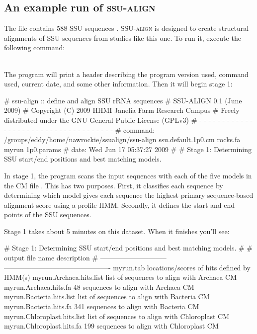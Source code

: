 \subsection{An example run of \textsc{ssu-align}}

The file  contains 588 SSU sequences
\cite{Walker07}. \textsc{SSU-align} is designed to create structural
alignments of SSU sequences from studies like this one. To run it,
execute the following command:

\\

The program will print a header describing the program version used,
command used, current date, and some other information. Then it will
begin stage 1:

\begin{sreoutput}
# ssu-align :: define and align SSU rRNA sequences
# SSU-ALIGN 0.1 (June 2009)
# Copyright (C) 2009 HHMI Janelia Farm Research Campus
# Freely distributed under the GNU General Public License (GPLv3)
# - - - - - - - - - - - - - - - - - - - - - - - - - - - - - - - - - - - -
# command: /groups/eddy/home/nawrockie/ssualign/ssu-align ssu.default.1p0.cm rocks.fa myrun 1p0.params
# date:    Wed Jun 17 05:37:27 2009
#
# Stage 1: Determining SSU start/end positions and best matching models.
\end{sreoutput}

In stage 1, the program scans the input sequences with each of the
five models in the CM file . This has two
purposes.  First, it classifies each sequence by determining which
model gives each sequence the highest primary sequence-based alignment
score using a profile HMM. Secondly, it defines the start and end
points of the SSU sequences.

Stage 1 takes about 5 minutes on this dataset. When it finishes you'll
see: 

\begin{sreoutput}
# Stage 1: Determining SSU start/end positions and best matching models.
#
# output file name               description                                   
# -----------------------------  ----------------------------------------------
  myrun.tab                      locations/scores of hits defined by HMM(s)
  myrun.Archaea.hits.list        list of sequences to align with Archaea CM
  myrun.Archaea.hits.fa               48 sequences to align with Archaea CM
  myrun.Bacteria.hits.list       list of sequences to align with Bacteria CM
  myrun.Bacteria.hits.fa             341 sequences to align with Bacteria CM
  myrun.Chloroplast.hits.list    list of sequences to align with Chloroplast CM
  myrun.Chloroplast.hits.fa          199 sequences to align with Chloroplast CM
\end{sreoutput}

